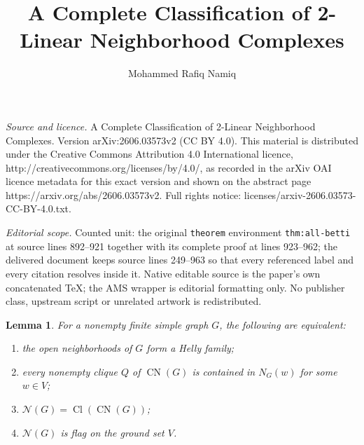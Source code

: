 \documentclass[10pt,a4paper]{amsart}
\newtheorem{lemma}[theorem]{Lemma}
\numberwithin{equation}{section}
\newcommand{\NN}{\mathcal N}
\newcommand{\Cl}{\operatorname{Cl}}
\newcommand{\CN}{\operatorname{CN}}
\begin{document}
\title[A Complete Classification of 2-Linear Neighborhood Complexes]{A Complete Classification of 2-Linear Neighborhood Complexes}
\author{Mohammed Rafiq Namiq}
\date{}
\maketitle
\noindent\emph{Source and licence.} A Complete Classification of 2-Linear Neighborhood Complexes. Version arXiv:2606.03573v2 (CC BY 4.0). This material is distributed under the Creative Commons Attribution 4.0 International licence, http://creativecommons.org/licenses/by/4.0/, as recorded in the arXiv OAI licence metadata for this exact version and shown on the abstract page https://arxiv.org/abs/2606.03573v2. Full rights notice: licenses/arxiv-2606.03573-CC-BY-4.0.txt.\par\smallskip
\noindent\textit{Editorial scope.} Counted unit: the original \texttt{theorem} environment \texttt{thm:all-betti} at source lines 892--921 together with its complete proof at lines 923--962; the delivered document keeps source lines 249--963 so that every referenced label and every citation resolves inside it. Native editable source is the paper's own concatenated TeX; the AMS wrapper is editorial formatting only. No publisher class, upstream script or unrelated artwork is redistributed.
	\begin{lemma}\label{lem:helly-flag}
		For a nonempty finite simple graph \(G\), the following are equivalent:
		\begin{enumerate}[label=\textup{(\roman*)}]
			\item the open neighborhoods of \(G\) form a Helly family;
			\item every nonempty clique \(Q\) of \(\CN(G)\) is contained in
			\(N_G(w)\) for some \(w\in V\);
			\item \(\NN(G)=\Cl(\CN(G))\);
			\item \(\NN(G)\) is flag on the ground set \(V\).
		\end{enumerate}
	\end{lemma}
	
\end{document}
